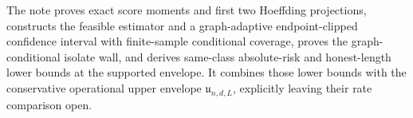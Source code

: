 The note proves exact score moments and first two Hoeffding projections, constructs the feasible estimator and a graph-adaptive endpoint-clipped confidence interval with finite-sample conditional coverage, proves the graph-conditional isolate wall, and derives same-class absolute-risk and honest-length lower bounds at the supported envelope.  It combines those lower bounds with the conservative operational upper envelope \(\mathfrak u_{n,d,L}\), explicitly leaving their rate comparison open.